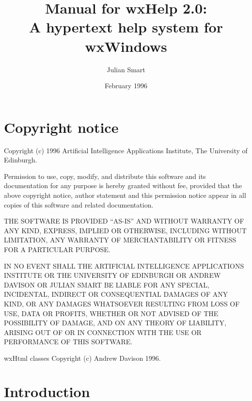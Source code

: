 %
\title{Manual for wxHelp 2.0:\\A hypertext help system for wxWindows}%
\author{Julian Smart}%
\date{February 1996}%
\parskip=10pt
\makeindex
%

\maketitle

\pagestyle{fancyplain}

\setfooter{\thepage}{}{}{}{}{\thepage}
\tableofcontents%

\chapter*{Copyright notice}
%
\setfooter{\thepage}{}{}{}{}{\thepage}

Copyright (c) 1996 Artificial Intelligence Applications Institute,
The University of Edinburgh.

Permission to use, copy, modify, and distribute this software and its
documentation for any purpose is hereby granted without fee, provided that the
above copyright notice, author statement and this permission notice appear in
all copies of this software and related documentation.

THE SOFTWARE IS PROVIDED ``AS-IS'' AND WITHOUT WARRANTY OF ANY KIND, EXPRESS,
IMPLIED OR OTHERWISE, INCLUDING WITHOUT LIMITATION, ANY WARRANTY OF
MERCHANTABILITY OR FITNESS FOR A PARTICULAR PURPOSE.

IN NO EVENT SHALL THE ARTIFICIAL INTELLIGENCE APPLICATIONS INSTITUTE OR
THE UNIVERSITY OF EDINBURGH OR ANDREW DAVISON OR JULIAN SMART BE LIABLE
FOR ANY SPECIAL, INCIDENTAL, INDIRECT OR CONSEQUENTIAL DAMAGES OF ANY
KIND, OR ANY DAMAGES WHATSOEVER RESULTING FROM LOSS OF USE, DATA OR
PROFITS, WHETHER OR NOT ADVISED OF THE POSSIBILITY OF DAMAGE, AND ON ANY
THEORY OF LIABILITY, ARISING OUT OF OR IN CONNECTION WITH THE USE OR
PERFORMANCE OF THIS SOFTWARE. 

wxHtml classes Copyright (c) Andrew Davison 1996.

\chapter{Introduction}
%
%
\setfooter{\thepage}{}{}{}{}{\thepage}

